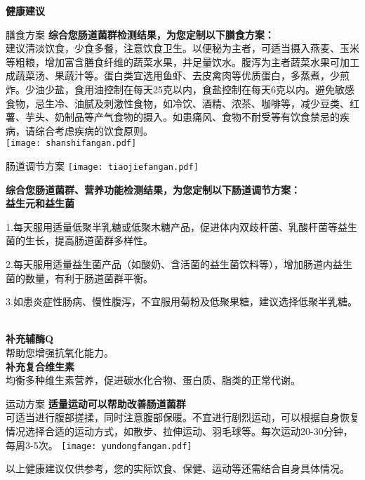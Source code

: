 

\usepackage{graphicx}
\graphicspath{{cores/}}



\vspace*{6mm}
\setlength{\arrayrulewidth}{1pt}
\fontsize{9.3pt}{11pt}\selectfont
\color{gray2}

\centerline{\bf\sanhao 健康建议}

\vspace*{2mm}

\begin{LRaside}[.20]{膳食方案}
{\bf *综合您肠道菌群检测结果，为您定制以下膳食方案：}\\
{\indent 建议清淡饮食，少食多餐，注意饮食卫生。以便秘为主者，可适当摄入燕麦、玉米等粗粮，增加富含膳食纤维的蔬菜水果，并足量饮水。腹泻为主者蔬菜水果可加工成蔬菜汤、果蔬汁等。蛋白类宜选用鱼虾、去皮禽肉等优质蛋白，多蒸煮，少煎炸。少油少盐，食用油控制在每天25克以内，食盐控制在每天6克以内。避免敏感食物，忌生冷、油腻及刺激性食物，如冷饮、酒精、浓茶、咖啡等，减少豆类、红薯、芋头、奶制品等产气食物的摄入。如患痛风、食物不耐受等有饮食禁忌的疾病，请综合考虑疾病的饮食原则。}\\
\asidebreak %
\noindent
\texttt{[image: shanshifangan.pdf]}

\end{LRaside}


\begin{LRaside}[.70]{肠道调节方案}
\noindent
\texttt{[image: tiaojiefangan.pdf]}

\asidebreak %
{\bf *综合您肠道菌群、营养功能检测结果，为您定制以下肠道调节方案：}\\
{\bf 益生元和益生菌}\\{\indent 1.每天服用适量低聚半乳糖或低聚木糖产品，促进体内双歧杆菌、乳酸杆菌等益生菌的生长，提高肠道菌群多样性。

2.每天服用适量益生菌产品（如酸奶、含活菌的益生菌饮料等），增加肠道内益生菌的数量，有利于肠道菌群平衡。

3.如患炎症性肠病、慢性腹泻，不宜服用菊粉及低聚果糖，建议选择低聚半乳糖。}\\
{\bf 补充辅酶Q}\\{\indent 帮助您增强抗氧化能力。}\\
{\bf 补充复合维生素}\\{\indent 均衡多种维生素营养，促进碳水化合物、蛋白质、脂类的正常代谢。}\\
\end{LRaside}

\begin{LRaside}[.20]{运动方案}
{\bf *适量运动可以帮助改善肠道菌群}\\
{\indent 可适当进行腹部搓揉，同时注意腹部保暖。不宜进行剧烈运动，可以根据自身恢复情况选择合适的运动方式，如散步、拉伸运动、羽毛球等。每次运动20-30分钟，每周3-5次。}
\asidebreak %
\noindent
\texttt{[image: yundongfangan.pdf]}

\end{LRaside}

{\noindent\qihao *以上健康建议仅供参考，您的实际饮食、保健、运动等还需结合自身具体情况。}



